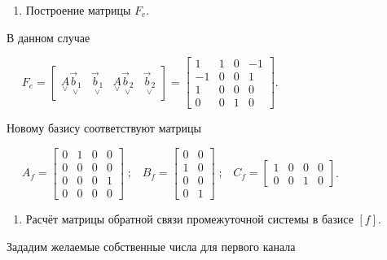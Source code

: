 \documentclass[a4paper]{article}
\newcounter{saveenum}
\newcommand\liststyleWWviiiNumlxxvi{%
\renewcommand\theenumi{\arabic{enumi}}
\renewcommand\theenumii{\alph{enumii}}
\renewcommand\theenumiii{\roman{enumiii}}
\renewcommand\theenumiv{\arabic{enumiv}}
\renewcommand\labelenumi{\theenumi.}
\renewcommand\labelenumii{\theenumii.}
\renewcommand\labelenumiii{\theenumiii.}
\renewcommand\labelenumiv{\theenumiv.}
}
\begin{document}
\liststyleWWviiiNumlxxvi
\setcounter{saveenum}{\value{enumi}}
\begin{enumerate}
\setcounter{enumi}{\value{saveenum}}
\item {\begin{russian}\sffamily
Построение матрицы  $F_e$.
\end{russian}}
\end{enumerate}
{\begin{russian}\sffamily
В данном случае
\end{russian}}

{\begin{russian}\sffamily
\textenglish{\ \ } $F_e=\left[\begin{matrix}\underset{\vee }{A}\underset{\vee }{\vec b_1}&\underset{\vee }{\vec
b_1}&\underset{\vee }{A}\underset{\vee }{\vec b_2}&\underset{\vee }{\vec
b_2}\end{matrix}\right]=\left[\begin{matrix}1&1&0&-1\\-1&0&0&1\\1&0&0&0\\0&0&1&0\end{matrix}\right]$.
\end{russian}}

{\begin{russian}\sffamily
Новому базису соответствуют матрицы
\end{russian}}

{\begin{russian}\sffamily
\textenglish{\ \ }
$A_f=\left[\begin{matrix}0&1&0&0\\0&0&0&0\\0&0&0&1\\0&0&0&0\end{matrix}\right]\;;\;\;\;B_f=\left[\begin{matrix}0&0\\1&0\\0&0\\0&1\end{matrix}\right]\;;\;\;\;C_f=\left[\begin{matrix}1&0&0&0\\0&0&1&0\end{matrix}\right]$.
\end{russian}}

\liststyleWWviiiNumlxxvi
\setcounter{saveenum}{\value{enumi}}
\begin{enumerate}
\setcounter{enumi}{\value{saveenum}}
\item {\begin{russian}\sffamily
Расчёт матрицы обратной связи промежуточной системы в базисе  $[f]$.
\end{russian}}
\end{enumerate}
{\begin{russian}\sffamily
Зададим желаемые собственные числа для первого канала
\end{russian}}
\end{document}
